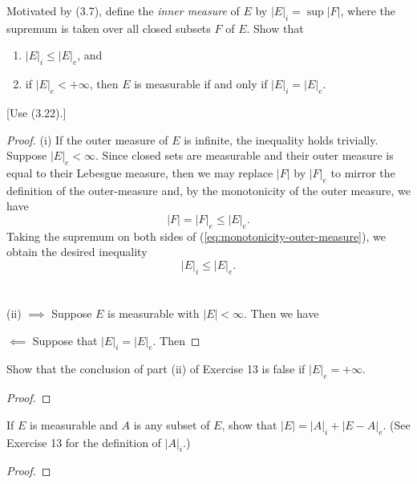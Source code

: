 \begin{problem}
Motivated by (3.7), define the \emph{inner measure} of $E$ by
$\left|E\right|_i=\sup\left|F\right|$, where the supremum is taken over all
closed subsets $F$ of $E$. Show that
\begin{enumerate}[label=(\roman*)]
\item $\left|E\right|_i\leq\left|E\right|_e$, and
\item if $\left|E\right|_e<+\infty$, then $E$ is measurable if and only if
  $\left|E\right|_i=\left|E\right|_e$.
\end{enumerate}
[Use (3.22).]
\end{problem}
\begin{proof}
(i) If the outer measure of $E$ is infinite, the inequality holds
trivially. Suppose $|E|_e<\infty$. Since closed sets are measurable and
their outer measure is equal to their Lebesgue measure, then we may replace
$\left|F\right|$ by $\left|F\right|_e$ to mirror the definition of the
outer-measure and, by the monotonicity of the outer measure, we have
\begin{equation}
\label{eq:monotonicity-outer-measure}
\left|F\right|=\left|F\right|_e\leq\left|E\right|_e.
\end{equation}
Taking the supremum on both sides of (\ref{eq:monotonicity-outer-measure}),
we obtain the desired inequality
\begin{equation}
\label{eq:inner-outer-measure}
\left|E\right|_i\leq\left|E\right|_e.
\end{equation}
\\\\
(ii) $\implies$ Suppose $E$ is measurable with
$\left|E\right|<\infty$. Then we have

$\impliedby$ Suppose that $\left|E\right|_i=\left|E\right|_e$. Then
\end{proof}
\newpage

\begin{problem}
  Show that the conclusion of part (ii) of Exercise 13 is false if
  $\left|E\right|_e=+\infty$.
\end{problem}
\begin{proof}
\end{proof}
\newpage


\begin{problem}
If $E$ is measurable and $A$ is any subset of $E$, show that
$\left|E\right|=\left|A\right|_i+\left|E-A\right|_e$. (See Exercise 13 for
the definition of $\left|A\right|_i$.)
\end{problem}
\begin{proof}
\end{proof}

